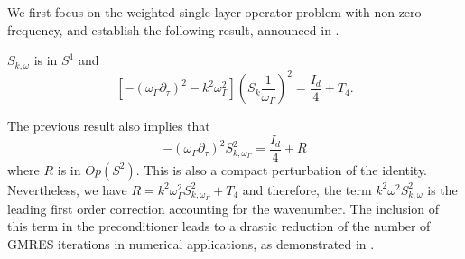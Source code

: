 \documentclass[a4paper]{article}
\begin{document}
We first focus on the weighted single-layer operator problem with non-zero frequency, and establish the following result, announced in \cite{alouges2018new}.
\begin{The}
	\label{TheSkomega}
	$S_{k,\omega}$ is in $S^1$ and
	\[\left[-(\omega_\Gamma \partial_\tau)^2 - k^2\omega_\Gamma^2\right] \left(S_k \frac{1}{\omega_\Gamma}\right)^2 = \frac{I_d}{4} + T_4.\]
\end{The}
\begin{Rem}
	The previous result also implies that
	\[-(\omega_\Gamma \partial_\tau)^2 S_{k,\omega_\Gamma}^2 = \frac{I_d}{4} + R\]
	where $R$ is in $\textit{Op}(S^2)$. This is also a compact perturbation of the identity. Nevertheless, we have $R = k^2 \omega_\Gamma^2 S_{k,\omega_\Gamma}^2 + T_4$ and therefore, the term $k^2 \omega^2S_{k,\omega}^2$ is the leading first order correction accounting for the wavenumber. The inclusion of this term in the preconditioner leads to a drastic reduction of the number of GMRES iterations in numerical applications, as demonstrated in \cite{alouges2018new}. 
\end{Rem}
\end{document}
